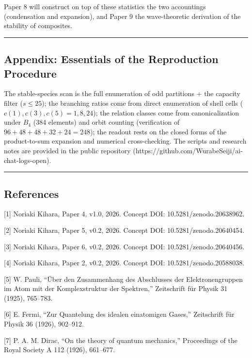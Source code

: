 \documentclass[
]{article}
\begin{document}
Paper 8 will construct on top of these statistics the two accountings
(condensation and expansion), and Paper 9 the wave-theoretic derivation
of the stability of composites.

\begin{center}\rule{0.5\linewidth}{0.5pt}\end{center}

\subsection{Appendix: Essentials of the Reproduction
Procedure}\label{appendix-essentials-of-the-reproduction-procedure}

The stable-species scan is the full enumeration of odd partitions + the
capacity filter (\(s\le25\)); the branching ratios come from direct
enumeration of shell cells (\(c(1),c(3),c(5)=1,8,24\)); the relation
classes come from canonicalization under \(B_4\) (384 elements) and
orbit counting (verification of \(96+48+48+32+24=248\)); the readout
rests on the closed forms of the product-to-sum expansion and numerical
cross-checking. The scripts and research notes are provided in the
public repository (https://github.com/WurabeSeiji/ai-chat-logs-open).

\begin{center}\rule{0.5\linewidth}{0.5pt}\end{center}

\subsection{References}\label{references}

{[}1{]} Noriaki Kihara, Paper 4, v1.0, 2026. Concept DOI:
10.5281/zenodo.20638962.

{[}2{]} Noriaki Kihara, Paper 5, v0.2, 2026. Concept DOI:
10.5281/zenodo.20640454.

{[}3{]} Noriaki Kihara, Paper 6, v0.2, 2026. Concept DOI:
10.5281/zenodo.20640456.

{[}4{]} Noriaki Kihara, Paper 2, v0.2, 2026. Concept DOI:
10.5281/zenodo.20588038.

{[}5{]} W. Pauli, ``Über den Zusammenhang des Abschlusses der
Elektronengruppen im Atom mit der Komplexstruktur der Spektren,''
Zeitschrift für Physik 31 (1925), 765--783.

{[}6{]} E. Fermi, ``Zur Quantelung des idealen einatomigen Gases,''
Zeitschrift für Physik 36 (1926), 902--912.

{[}7{]} P. A. M. Dirac, ``On the theory of quantum mechanics,''
Proceedings of the Royal Society A 112 (1926), 661--677.
\end{document}
